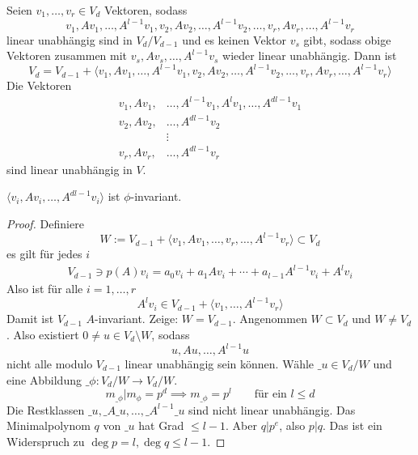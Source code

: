 \documentclass[a4paper, 10pt]{scrbook}
\begin{document}
\begin{lem}
	\label{lem:12.14}
	Seien $v_1,\dotsc, v_r \in V_d$ Vektoren, sodass
	\[
		v_1,Av_1, \dotsc, A^{l-1}v_1, v_2, Av_2, \dotsc, A^{l-1}v_2, \dotsc, v_r,Av_r, \dotsc, A^{l-1}v_r
	\]
	linear unabhängig sind in $V_d/V_{d-1}$ und es keinen Vektor $v_s$ gibt, sodass obige Vektoren zusammen mit $v_s,Av_s,\dotsc, A^{l-1}v_s$ wieder linear unabhängig.
	Dann ist
	\[
		V_d =  V_{d-1} + \langle v_1,Av_1, \dotsc, A^{l-1}v_1, v_2, Av_2, \dotsc, A^{l-1}v_2, \dotsc, v_r,Av_r, \dotsc, A^{l-1}v_r\rangle
	\]
	Die Vektoren
	\begin{align*}
		v_1, Av_1, &\dotsc, A^{l-1}v_1, A^lv_1, \dotsc, A^{dl-1}v_1\\
		v_2, Av_2, &\dotsc, A^{dl-1}v_2\\
		&\vdots\\
		v_r, Av_r, &\dotsc, A^{dl-1}v_r
	\end{align*}
	sind linear unabhängig in $V$.
	\begin{note}
		$\langle v_i, Av_i, \dotsc, A^{dl-1}v_i\rangle$ ist $\phi$-invariant.
	\end{note}
	\begin{proof}
		Definiere
		\[
			W:= V_{d-1} + \langle v_1, Av_1, \dotsc, v_r, \dotsc, A^{l-1}v_r\rangle \subset V_d
		\]
		es gilt für jedes $i$
		\begin{align*}
			V_{d-1} \ni p(A)v_i = a_0v_i + a_1Av_i + \dotsb + a_{l-1}A^{l-1}v_i + A^lv_i
		\end{align*}
		Also ist für alle $i=1,\dotsc,r$
		\[
			A^lv_i \in V_{d-1} + \langle v_1,\dotsc, A^{l-1}v_r\rangle
		\]
		Damit ist $V_{d-1}$ $A$-invariant.
		Zeige: $W = V_{d-1}$.
		Angenommen $W\subset V_d$ und $W\neq V_d$.
		Also existiert $0\neq u\in V_d \setminus W$, sodass
		\[
			u, Au, \dotsc, A^{l-1}u
		\]
		nicht alle modulo $V_{d-1}$ linear unabhängig sein können.
		Wähle $\_u\in V_d/W$ und eine Abbildung $\_\phi: V_d/W \to V_d/W$.
		\[
			m_{\_\phi}| m_{\phi} = p^d \implies m_{\_\phi} = p^l \qquad \text{für ein $l\le d$}
		\]
		Die Restklassen $\_u, \_A\_u, \dotsc, \_A^{l-1}\_u$ sind nicht linear unabhängig.
		Das Minimalpolynom $q$ von $\_u$ hat Grad $\le l-1$.
		Aber $q|p^e$, also $p|q$.
		Das ist ein Widerspruch zu $\deg p=l, \deg q \le l-1$.


\end{proof}
\end{lem}
\end{document}
